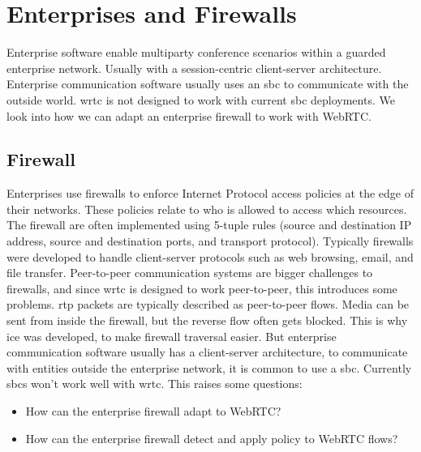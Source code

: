 \section{Enterprises and Firewalls}
Enterprise software enable multiparty conference scenarios within a guarded enterprise network. Usually with a session-centric client-server architecture. Enterprise communication software usually uses an \gls{sbc} to communicate with the outside world. \gls{wrtc} is not designed to work with current \gls{sbc} deployments. We look into how we can adapt an enterprise firewall to work with WebRTC.


\subsection{Firewall}
Enterprises use firewalls to enforce Internet Protocol access policies at the edge of their networks. These policies relate to who is allowed to access which resources. The firewall are often implemented using 5-tuple rules (source and destination IP address, source and destination ports, and transport protocol). Typically firewalls were developed to handle client-server protocols such as web browsing, email, and file transfer\cite{johnston_taking_2013}. Peer-to-peer communication systems are bigger challenges to firewalls, and since \gls{wrtc} is designed to work peer-to-peer, this introduces some problems. \gls{rtp} packets are typically described as peer-to-peer flows. Media can be sent from inside the firewall, but the reverse flow often gets blocked. This is why \gls{ice} was developed, to make firewall traversal easier. But enterprise communication software usually has a client-server architecture, to communicate with entities outside the enterprise network, it is common to use a \gls{sbc}. Currently \gls{sbc}s won't work well with \gls{wrtc}. This raises some questions:

\begin{itemize}
\item{How can the enterprise firewall adapt to WebRTC?}
\item{How can the enterprise firewall detect and apply policy to WebRTC flows?}
\end{itemize}

